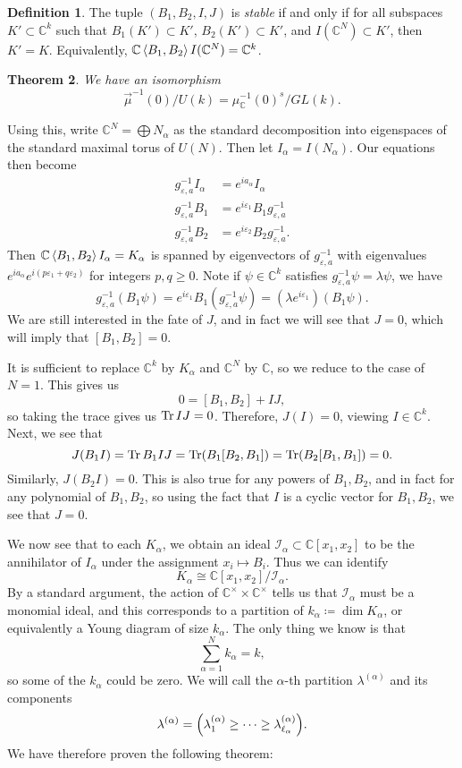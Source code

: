 \documentclass[leqno, openany]{memoir}
\newtheorem{thm}{Theorem}[section]
\theoremstyle{definition}
\newtheorem{defn}[thm]{Definition}
\theoremstyle{remark}
\theoremstyle{plain}
\theoremstyle{definition}
\theoremstyle{remark}
\newcommand{\C}{\mathbb{C}}
\newcommand{\ep}{\varepsilon}
\newcommand{\mc}[1]{\mathcal{#1}}
\begin{document}
\begin{defn}
    The tuple $(B_1, B_2, I, J)$ is \textit{stable} if and only if for all subspaces $K' \subset \C^k$ such that $B_1(K') \subset K'$, $B_2(K') \subset K'$, and $I(\C^N) \subset K'$, then $K' = K$. Equivalently, $\C\ev{B_1, B_2} I(\C^N) = \C^k$.
\end{defn}

\begin{thm}
    We have an isomorphism
    \[ \vec{\mu}^{-1}(0) / U(k) = \mu_{\C}^{-1}(0)^s / GL(k). \]
\end{thm}

Using this, write $\C^N = \bigoplus N_{\alpha}$ as the standard decomposition into eigenspaces of the standard maximal torus of $U(N)$. Then let $I_{\alpha} = I(N_{\alpha})$. Our equations then become
\begin{align*}
    g^{-1}_{\ep, a} I_{\alpha} &= e^{i a_{\alpha}} I_{\alpha} \\
    g^{-1}_{\ep, a} B_1 &= e^{i \ep_1} B_1 g_{\ep, a}^{-1} \\
    g^{-1}_{\ep, a} B_2 &= e^{i \ep_2} B_2 g_{\ep, a}^{-1} .
\end{align*}
Then $\C\ev{B_1, B_2} I_{\alpha} = K_{\alpha}$ is spanned by eigenvectors of $g^{-1}_{\ep, a}$ with eigenvalues $e^{i a_{\alpha}} e^{i(p \ep_1 + q \ep_2)}$ for integers $p,q \geq 0$. Note if $\psi \in \C^k$ satisfies $g^{-1}_{\ep, a} \psi = \lambda \psi$, we have
\[ g_{\ep, a}^{-1}(B_1 \psi) = e^{i \ep_1} B_1 (g_{\ep, a}^{-1} \psi) = (\lambda e^{i \ep_1})(B_1 \psi). \]
We are still interested in the fate of $J$, and in fact we will see that $J = 0$, which will imply that $[B_1, B_2] = 0$. 

It is sufficient to replace $\C^k$ by $K_{\alpha}$ and $\C^N$ by $\C$, so we reduce to the case of $N=1$. This gives us
\[ 0 = [B_1, B_2] + IJ, \]
so taking the trace gives us $\Tr IJ = 0$. Therefore, $J(I) = 0$, viewing $I \in \C^k$. Next, we see that 
\[ J(B_1 I) = \Tr B_1 IJ = \Tr (B_1 [B_2, B_1]) = \Tr (B_2[B_1, B_1]) = 0. \]
Similarly, $J(B_2 I) = 0$. This is also true for any powers of $B_1, B_2$, and in fact for any polynomial of $B_1, B_2$, so using the fact that $I$ is a cyclic vector for $B_1, B_2$, we see that $J=0$.

We now see that to each $K_{\alpha}$, we obtain an ideal $\mc{I}_{\alpha} \subset \C[x_1, x_2]$ to be the annihilator of $I_{\alpha}$ under the assignment $x_i \mapsto B_i$. Thus we can identify
\[ K_{\alpha} \cong \C[x_1, x_2] / \mc{I}_{\alpha}. \]
By a standard argument, the action of $\C^{\times} \times \C^{\times}$ tells us that $\mc{I}_{\alpha}$ must be a monomial ideal, and this corresponds to a partition of $k_{\alpha} \coloneqq \dim K_{\alpha}$, or equivalently a Young diagram of size $k_{\alpha}$. The only thing we know is that
\[ \sum_{\alpha = 1}^N k_{\alpha} = k, \]
so some of the $k_{\alpha}$ could be zero. We will call the $\alpha$-th partition $\lambda^{(\alpha)}$ and its components
\[ \lambda^{(\alpha)} = \qty(\lambda_1^{(\alpha)} \geq \cdots \geq \lambda_{\ell_{\alpha}}^{(\alpha)}). \]
We have therefore proven the following theorem:
\end{document}
